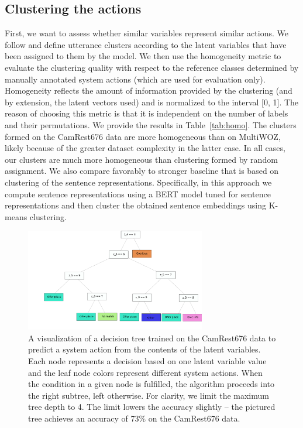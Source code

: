 \subsection{Clustering the actions}
\label{sec:clustering}
First, we want to assess whether similar variables represent similar actions.
We follow \citet{zhao2018unsupervised} and define utterance clusters according to the latent variables that have been assigned to them by the model.
We then use the homogeneity metric \cite{rosenberg-hirschberg-2007-v} to evaluate the clustering quality with respect to the reference classes determined by manually annotated system actions (which are used for evaluation only).
Homogeneity reflects the amount of information provided by the clustering (and by extension, the latent vectors used) and is normalized to the interval [0, 1].
The reason of choosing this metric is that it is independent on the number of labels and their permutations.
We provide the results in Table~\ref{tab:homo}.
The clusters formed on the CamRest676 data are more homogeneous than on MultiWOZ, likely because of the greater dataset complexity in the latter case. 
In all cases, our clusters are much more homogeneous than clustering formed by random assignment.
We also compare favorably to stronger baseline that is based on clustering of the sentence representations.
Specifically, in this approach we compute sentence representations using a BERT model tuned for sentence representations \cite{reimers-2019-sentence-bert} and then cluster the obtained sentence embeddings using K-means clustering.

\begin{figure}[t]
    \centering
    \includegraphics[width=0.70\textwidth]{images/dt2.pdf}
    \vspace{-5mm}
    \caption{A visualization of a decision tree trained on the CamRest676 data to predict a system action from the contents of the latent variables. Each node represents a decision based on one latent variable value and the leaf node colors represent different system actions. When the condition in a given node is fulfilled, the algorithm proceeds into the right subtree, left otherwise. For clarity, we limit the maximum tree depth to 4. The limit lowers the accuracy slightly -- the pictured tree achieves an accuracy of 73\% on the CamRest676 data.}
    \label{fig:dt}
\end{figure}


